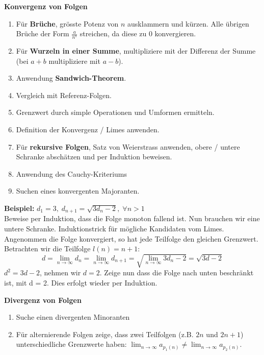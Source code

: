 \begin{exercise}
    \textbf{Konvergenz von Folgen}

    \begin{enumerate}[label=(\arabic*)]
        \item Für \textbf{Brüche}, grösste Potenz von $n$ ausklammern und kürzen. Alle übrigen Brüche der Form $\frac{a}{n^s}$ streichen,
        da diese zu 0 konvergieren.
        \item Für \textbf{Wurzeln in einer Summe}, multipliziere mit der Differenz der Summe (bei $a + b$
        multipliziere mit $a - b$). 	
        \item Anwendung \textbf{Sandwich-Theorem}.
        \item Vergleich mit Referenz-Folgen.
        \item Grenzwert durch simple Operationen und Umformen ermitteln.
        \item Definition der Konvergenz / Limes anwenden.
        \item Für \textbf{rekursive Folgen}, Satz von Weierstrass anwenden, obere / untere Schranke abschätzen
        und per Induktion beweisen.
        \item Anwendung des Cauchy-Kriteriums
        \item Suchen eines konvergenten Majoranten.
    \end{enumerate}

    \textbf{Beispiel:} $d_1 = 3, \; d_{n+1} = \sqrt{3d_n -2}, \; \forall n > 1$ \\
    Beweise per Induktion, dass die Folge monoton fallend ist. Nun brauchen wir eine untere Schranke.
    Induktionstrick für mögliche Kandidaten vom Limes. Angenommen die Folge konvergiert, so hat jede
    Teilfolge den gleichen Grenzwert. Betrachten wir die Teilfolge $l(n) = n+1$:
    $$d = \lim_{n \to \infty} d_n =\lim_{n \to \infty} d_{n+1} = \sqrt{\lim_{n \to \infty} 3d_n -2} = \sqrt{3d -2}$$
    $d^2 = 3d -2$, nehmen wir $d = 2$. Zeige nun dass die Folge nach unten beschränkt ist, mit d = 2.
    Dies erfolgt wieder per Induktion.
\end{exercise}

\begin{exercise}
    \textbf{Divergenz von Folgen}

    \begin{enumerate}[label=(\arabic*)]
        \item Suche einen divergenten Minoranten
        \item Für alternierende Folgen zeige, dass zwei Teilfolgen (z.B. $2n$ und $2n+1$) unterschiedliche Grenzwerte haben: $\lim_{n \rightarrow \infty} a_{p_1(n)} \neq \lim_{n \rightarrow \infty} a_{p_2(n)}$.
    \end{enumerate}
\end{exercise}

